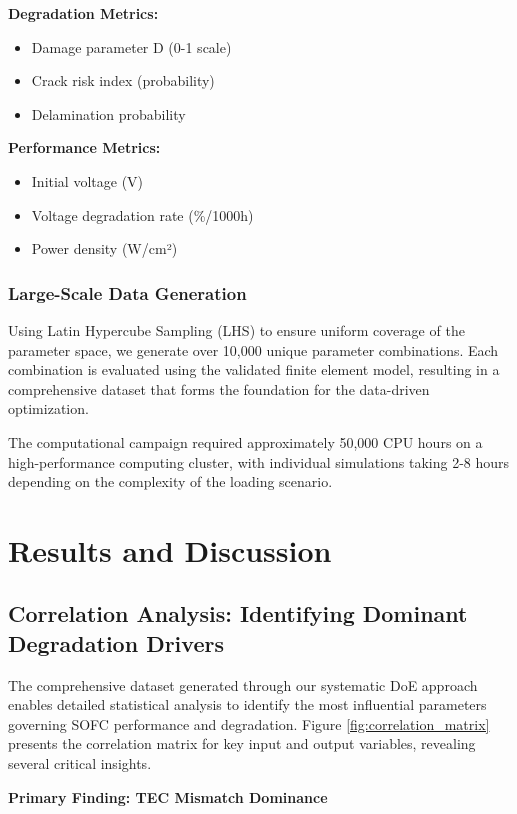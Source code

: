 \documentclass[conference]{IEEEtran}
\begin{document}
\textbf{Degradation Metrics:}
\begin{itemize}
\item Damage parameter D (0-1 scale)
\item Crack risk index (probability)
\item Delamination probability
\end{itemize}

\textbf{Performance Metrics:}
\begin{itemize}
\item Initial voltage (V)
\item Voltage degradation rate (\%/1000h)
\item Power density (W/cm²)
\end{itemize}

\subsubsection{Large-Scale Data Generation}

Using Latin Hypercube Sampling (LHS) to ensure uniform coverage of the parameter space, we generate over 10,000 unique parameter combinations. Each combination is evaluated using the validated finite element model, resulting in a comprehensive dataset that forms the foundation for the data-driven optimization.

The computational campaign required approximately 50,000 CPU hours on a high-performance computing cluster, with individual simulations taking 2-8 hours depending on the complexity of the loading scenario.

\section{Results and Discussion}

\subsection{Correlation Analysis: Identifying Dominant Degradation Drivers}

The comprehensive dataset generated through our systematic DoE approach enables detailed statistical analysis to identify the most influential parameters governing SOFC performance and degradation. Figure \ref{fig:correlation_matrix} presents the correlation matrix for key input and output variables, revealing several critical insights.

\textbf{Primary Finding: TEC Mismatch Dominance}
\end{document}
